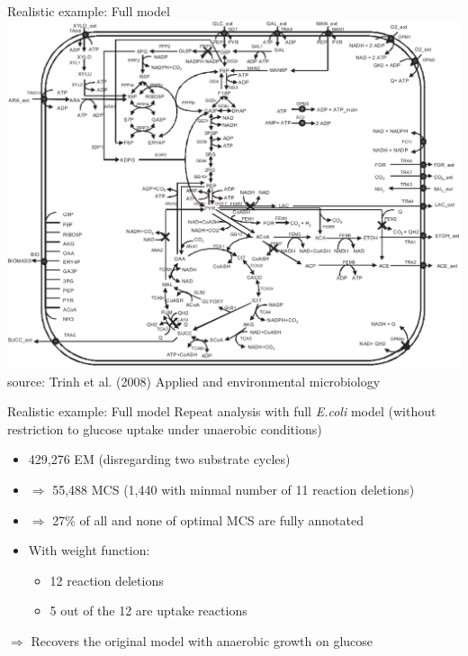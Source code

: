 \documentclass{beamer}
\begin{document}
\begin{frame}{Realistic example: Full model}
    \includegraphics[height=.86\textheight]{grafik/fullmodel} \\
    \tiny{source: Trinh et al. (2008) Applied and environmental microbiology}
\end{frame}

\begin{frame}{Realistic example: Full model}
Repeat analysis with full \emph{E.coli} model 
(without restriction to glucose uptake under unaerobic conditions)
\pause
\begin{itemize}
	\item 429,276 EM (disregarding two substrate cycles) %
	\item $\Rightarrow$ 55,488 MCS (1,440 with minmal number of 11 reaction deletions)
	\item $\Rightarrow$ 27\% of all and none of optimal MCS are fully annotated
\pause
	\item With weight function:
	\begin{itemize}
		\item 12 reaction deletions
		\item 5 out of the 12 are uptake reactions
	\end{itemize}
\end{itemize}
$\Rightarrow$ Recovers the original model with anaerobic growth on glucose

\end{frame}

\end{document}
